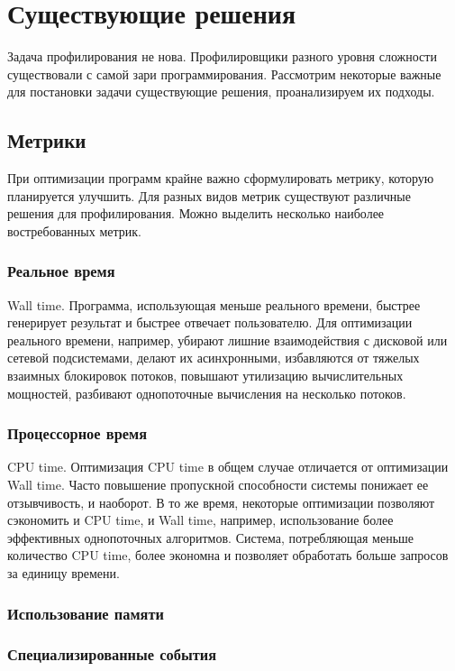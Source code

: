 \section{Существующие решения}
Задача профилирования не нова.
Профилировщики разного уровня сложности существовали с самой зари программирования.
Рассмотрим некоторые важные для постановки задачи существующие решения, проанализируем их подходы.

\subsection{Метрики}
При оптимизации программ крайне важно сформулировать метрику, которую планируется улучшить.
Для разных видов метрик существуют различные решения для профилирования. Можно выделить несколько наиболее востребованных метрик.

\subsubsection{Реальное время}
Wall time. Программа, использующая меньше реального времени, быстрее генерирует результат и быстрее отвечает пользователю. Для оптимизации реального времени, например, убирают лишние взаимодействия с дисковой или сетевой подсистемами, делают их асинхронными, избавляются от тяжелых взаимных блокировок потоков, повышают утилизацию вычислительных мощностей, разбивают однопоточные вычисления на несколько потоков.

\subsubsection{Процессорное время}
CPU time. Оптимизация CPU time в общем случае отличается от оптимизации Wall time. Часто повышение пропускной способности системы понижает ее отзывчивость, и наоборот. В то же время, некоторые оптимизации позволяют сэкономить и CPU time, и Wall time, например, использование более эффективных однопоточных алгоритмов. Система, потребляющая меньше количество CPU time, более экономна и позволяет обработать больше запросов за единицу времени.

\subsubsection{Использование памяти}

\subsubsection{Специализированные события}

